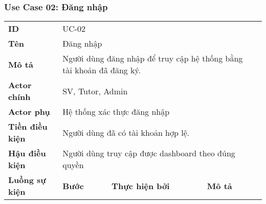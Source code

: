 \subsubsection*{Use Case 02: Đăng nhập}
\begin{samepage}
\begin{table}[h!]
\begin{tabular}{|l|lll|l}
\cline{1-4}
\textbf{ID}               & \multicolumn{3}{l|}{UC-02}                                                                                                                                                                                    &  \\ \cline{1-4}
\textbf{Tên}              & \multicolumn{3}{l|}{Đăng nhập}                                                                                                                                                                                &  \\ \cline{1-4}
\textbf{Mô tả}            & \multicolumn{3}{l|}{Người dùng đăng nhập để truy cập hệ thống bằng tài khoản đã đăng ký.}                                                                                                                     &  \\ \cline{1-4}
\textbf{Actor chính}      & \multicolumn{3}{l|}{SV, Tutor, Admin}                                                                                                                                                                         &  \\ \cline{1-4}
\textbf{Actor phụ}        & \multicolumn{3}{l|}{Hệ thống xác thực đăng nhập}                                                                                                                                                              &  \\ \cline{1-4}
\textbf{Tiền điều kiện}   & \multicolumn{3}{l|}{Người dùng đã có tài khoản hợp lệ.}                                                                                                                                                       &  \\ \cline{1-4}
\textbf{Hậu điều kiện}    & \multicolumn{3}{l|}{Người dùng truy cập được dashboard theo đúng quyền}                                                                                                                                       &  \\ \cline{1-4}
\textbf{Luồng sự kiện}    & \multicolumn{1}{l|}{\textbf{Bước}} & \multicolumn{1}{l|}{\textbf{Thực hiện bởi}} & \textbf{Mô tả}                                                                                                             &  \\ \cline{1-4}

\end{tabular}
\end{table}
\end{samepage}

